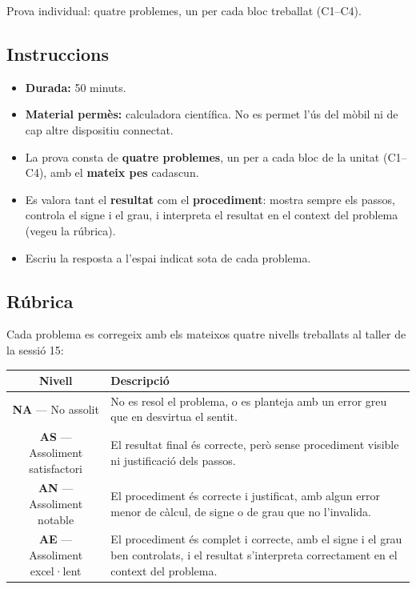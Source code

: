 %
{Prova individual: quatre problemes, un per cada bloc treballat (C1–C4).}

\subsection{Instruccions}

\begin{itemize}[leftmargin=1.4em, itemsep=2pt]
  \item \textbf{Durada:} 50 minuts.
  \item \textbf{Material permès:} calculadora científica. No es permet
        l'ús del mòbil ni de cap altre dispositiu connectat.
  \item La prova consta de \textbf{quatre problemes}, un per a cada bloc
        de la unitat (C1–C4), amb el \textbf{mateix pes} cadascun.
  \item Es valora tant el \textbf{resultat} com el \textbf{procediment}:
        mostra sempre els passos, controla el signe i el grau, i
        interpreta el resultat en el context del problema (vegeu la
        rúbrica).
  \item Escriu la resposta a l'espai indicat sota de cada problema.
\end{itemize}

\subsection{Rúbrica}

Cada problema es corregeix amb els mateixos quatre nivells treballats al
taller de la sessió 15:

\begin{center}
\renewcommand{\arraystretch}{1.3}
\begin{tabular}{|c|p{9.7cm}|}
\hline
\textbf{Nivell} & \textbf{Descripció} \\
\hline
\textbf{NA} — No assolit &
  No es resol el problema, o es planteja amb un error greu que en
  desvirtua el sentit. \\
\hline
\textbf{AS} — Assoliment satisfactori &
  El resultat final és correcte, però sense procediment visible ni
  justificació dels passos. \\
\hline
\textbf{AN} — Assoliment notable &
  El procediment és correcte i justificat, amb algun error menor de
  càlcul, de signe o de grau que no l'invalida. \\
\hline
\textbf{AE} — Assoliment excel·lent &
  El procediment és complet i correcte, amb el signe i el grau ben
  controlats, i el resultat s'interpreta correctament en el context
  del problema. \\
\hline
\end{tabular}
\end{center}

